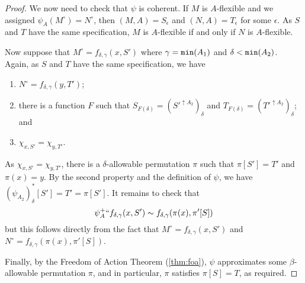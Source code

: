 \documentclass[112pt]{article}
\theoremstyle{definition}
\theoremstyle{remark}
\newcommand{\rk}[1]{{\color{blue}\sl #1}}
\newcommand{\suggest}[1]{{\color{red} #1}}
\newcommand{\hsuggest}[1]{{\color{magenta}#1}}
\begin{document}
\begin{proof}
We now need to check that $\psi$ is coherent.
If $M$ is $A$-flexible and we assigned $\psi_A(M^\circ) = N^\circ$, then $(M,A) = S_\epsilon$ and $(N,A) = T_\epsilon$ for some $\epsilon$.
As $S$ and $T$ have the same specification, $M$ is $A$-flexible if and only if $N$ is $A$-flexible.

Now suppose that $M^\circ = f_{\delta,\gamma}(x, S')$ where $\gamma = {\tt min}(A_1)$ and $\delta < {\tt min}(A_2)$.
Again, as $S$ and $T$ have the same specification, we have
\begin{enumerate}
  \item $N^\circ = f_{\delta,\gamma}(y, T')$;
  \item there is a function $F$ such that $S_{F(\delta)} = ({S'}^{\uparrow A_2})_\delta$ and $T_{F(\delta)} = ({T'}^{\uparrow A_2})_\delta$; and
  \item $\chi_{x,S'} = \chi_{y,T'}$.
\end{enumerate}
As $\chi_{x,S'} = \chi_{y,T'}$, there is a $\delta$-allowable permutation $\pi$ such that $\pi[S'] = T'$ and $\pi(x) = y$.
By the second property and the definition of $\psi$, we have $(\psi_{A_2})_\delta^*[S'] = T' = \pi[S']$.
It remains to check that
$$ \psi_A^+``f_{\delta,\gamma}(x,S') \sim f_{\delta,\gamma}(\pi(x),\pi'[S]) $$
but this follows directly from the fact that $M^\circ = f_{\delta,\gamma}(x,S')$ and $N^\circ = f_{\delta,\gamma}(\pi(x),\pi'[S])$.


Finally, by the Freedom of Action Theorem (\ref{thm:foa}), $\psi$ approximates some $\beta$-allowable permutation $\pi$, and in particular, $\pi$ satisfies $\pi[S] = T$, as required.

\begin{comment}

If we have $S_\epsilon = (\{x\},A)$, we will have $T_\epsilon = (\{y\},A)$ for some $y$, and we will set $\pi^0_A(\{x\}) = \{y\}$ as part of the construction of the approximation to be used.     Note that if $S_\delta = (\{x\},A)$ for $\delta \neq \epsilon$, the fact that $S$ and
$T$ have the same specification ensures that $T_\delta = (\{y\},A)$, because the specification contains the information that the specified supports have the same values at $\epsilon$ and $\delta$.


\end{comment}
\end{proof}
\end{document}

